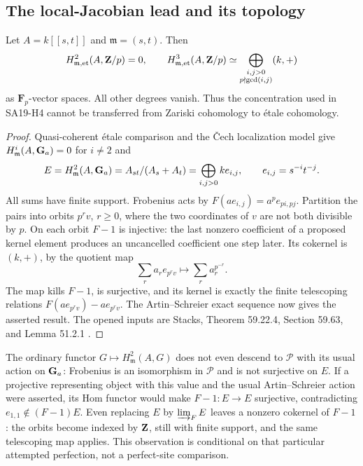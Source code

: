 \subsection{The local-Jacobian lead and its topology}
\begin{proposition}
\label{h:local}
Let $A=k[[s,t]]$ and $\mathfrak m=(s,t)$. Then
\[
 H^2_{\mathfrak m,\mathrm{et}}(A,\mathbf Z/p)=0,
 \qquad
 H^3_{\mathfrak m,\mathrm{et}}(A,\mathbf Z/p)
 \simeq\bigoplus_{\substack{i,j>0\\p\nmid\gcd(i,j)}}(k,+)
\]
as $\mathbf F_p$-vector spaces. All other degrees vanish.
Thus the concentration used in SA19-H4 cannot be transferred from
Zariski cohomology to \'etale cohomology.
\end{proposition}
\begin{proof}
Quasi-coherent \'etale comparison and the \v Cech localization model
give $H^i_{\mathfrak m}(A,\mathbf G_a)=0$ for $i\ne2$ and
\[
 E=H^2_{\mathfrak m}(A,\mathbf G_a)
   =A_{st}/(A_s+A_t)
   =\bigoplus_{i,j>0}k e_{i,j},\qquad e_{i,j}=s^{-i}t^{-j}.
\]
All sums have finite support. Frobenius acts by
$F(ae_{i,j})=a^p e_{pi,pj}$. Partition the pairs into orbits
$p^r v$, $r\geq0$, where the two coordinates of $v$ are not both
divisible by $p$. On each orbit $F-1$ is injective: the last nonzero
coefficient of a proposed kernel element produces an uncancelled
coefficient one step later. Its cokernel is $(k,+)$, by the quotient
map
\[
 \sum_r a_r e_{p^r v}\longmapsto\sum_r a_r^{p^{-r}}.
\]
The map kills $F-1$, is surjective, and its kernel is exactly the
finite telescoping relations $F(ae_{p^r v})-ae_{p^r v}$.
The Artin--Schreier exact sequence now gives the asserted result.
The opened inputs are Stacks, Theorem 59.22.4, Section 59.63, and
Lemma 51.2.1 \cite{StacksEtaleQC,StacksAS,StacksLocalCech}.
\end{proof}

The ordinary functor $G\mapsto H^2_{\mathfrak m}(A,G)$ does not even
descend to $\mathcal P$ with its usual action on $\mathbf G_a$:
Frobenius is an isomorphism in $\mathcal P$ and is not surjective on
$E$. If a projective representing object with this value and the
usual Artin--Schreier action were asserted, its Hom functor would make
$F-1:E\to E$ surjective, contradicting $e_{1,1}\notin(F-1)E$.
Even replacing $E$ by $\varinjlim_F E$ leaves a nonzero cokernel of
$F-1$: the orbits become indexed by $\mathbf Z$, still with finite support,
and the same telescoping map applies. This observation is conditional
on that particular attempted perfection, not a perfect-site comparison.

